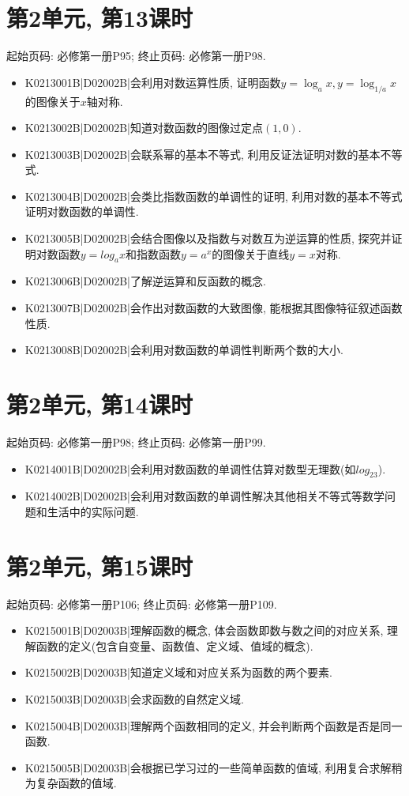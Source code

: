 \section*{第2单元, 第13课时}
起始页码: 必修第一册P95; 终止页码: 必修第一册P98.
\begin{itemize}
\item K0213001B|D02002B|会利用对数运算性质, 证明函数$y=\log_ax,y=\log_{1/a}x$的图像关于$x$轴对称.
\item K0213002B|D02002B|知道对数函数的图像过定点$(1,0)$.
\item K0213003B|D02002B|会联系幂的基本不等式, 利用反证法证明对数的基本不等式.
\item K0213004B|D02002B|会类比指数函数的单调性的证明, 利用对数的基本不等式证明对数函数的单调性.
\item K0213005B|D02002B|会结合图像以及指数与对数互为逆运算的性质, 探究并证明对数函数$y=log_ax$和指数函数$y=a^{x}$的图像关于直线$y=x$对称.
\item K0213006B|D02002B|了解逆运算和反函数的概念.
\item K0213007B|D02002B|会作出对数函数的大致图像, 能根据其图像特征叙述函数性质.
\item K0213008B|D02002B|会利用对数函数的单调性判断两个数的大小.
\end{itemize}

\section*{第2单元, 第14课时}
起始页码: 必修第一册P98; 终止页码: 必修第一册P99.
\begin{itemize}
\item K0214001B|D02002B|会利用对数函数的单调性估算对数型无理数(如$log_23$).
\item K0214002B|D02002B|会利用对数函数的单调性解决其他相关不等式等数学问题和生活中的实际问题.
\end{itemize}

\section*{第2单元, 第15课时}
起始页码: 必修第一册P106; 终止页码: 必修第一册P109.
\begin{itemize}
\item K0215001B|D02003B|理解函数的概念, 体会函数即数与数之间的对应关系, 理解函数的定义(包含自变量、函数值、定义域、值域的概念).
\item K0215002B|D02003B|知道定义域和对应关系为函数的两个要素.
\item K0215003B|D02003B|会求函数的自然定义域.
\item K0215004B|D02003B|理解两个函数相同的定义, 并会判断两个函数是否是同一函数.
\item K0215005B|D02003B|会根据已学习过的一些简单函数的值域, 利用复合求解稍为复杂函数的值域.
\end{itemize}

